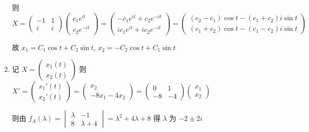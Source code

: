 \begin{enumerate}
                   则 \( X = \begin{pmatrix}
                       -1 & 1 \\
                       i  & i
                   \end{pmatrix}\begin{pmatrix}
                       c_{1}e^{it} \\
                       c_{2}e^{-it}
                   \end{pmatrix} = \begin{pmatrix}
                       -c_{1}e^{it} + c_{2}e^{-it} \\
                       ic_{1}e^{it} + ic_{2}e^{-it}
                   \end{pmatrix} = \begin{pmatrix}
                       (c_{2}-c_{1})\cos t - (c_{1}+c_{2})i\sin t \\
                       (c_{1}+c_{2})\cos t - (c_{1}-c_{2})i\sin t
                   \end{pmatrix} \)

                   故 \( x_{1} = C_{1}\cos t + C_{2}\sin t \), \( x_{2} = -C_{2}\cos t + C_{1}\sin t \)
             \item %
                   记 \( X = \begin{pmatrix}
                       x_{1}(t) \\
                       x_{2}(t)
                   \end{pmatrix} \) 则 \( X' = \begin{pmatrix}
                       x_{1}'(t) \\
                       x_{2}'(t)
                   \end{pmatrix} = \begin{pmatrix}
                       x_{2} \\
                       -8x_{1} - 4x_{2}
                   \end{pmatrix} = \begin{pmatrix}
                       0  & 1  \\
                       -8 & -4
                   \end{pmatrix}\begin{pmatrix}
                       x_{1} \\
                       x_{2}
                   \end{pmatrix} \)

                   则由 \( f_{A}(\lambda) = \begin{vmatrix}
                       \lambda & -1        \\
                       8       & \lambda+4
                   \end{vmatrix} = \lambda^{2} + 4\lambda + 8 \) 得 \( \lambda \) 为 \( -2 \pm 2i \)


\end{enumerate}
